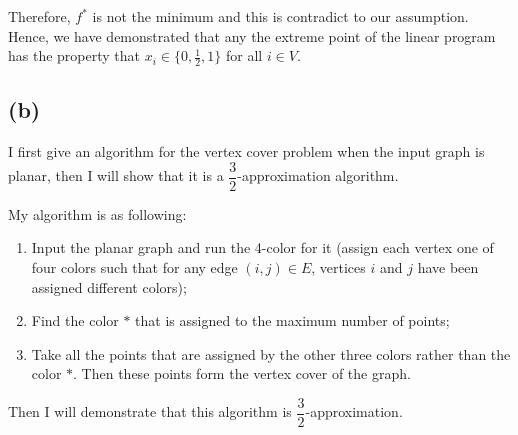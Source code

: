 \documentclass[a4paper,12pt]{article}
\begin{document}
Therefore, $f^*$ is not the minimum and this is contradict to our assumption. Hence, we have demonstrated that any the extreme point of the linear program has the property that  $ x_i \in \{0, \frac{1}{2}, 1\}$ for all $i \in V$. 

\subsection*{(b)}
I first give an algorithm for the vertex cover problem when the input graph is planar, then I will show that it is a $\dfrac{3}{2}$-approximation algorithm.

My algorithm is as following:
\begin{enumerate}
\item Input the planar graph and run the 4-color for it (assign each vertex one of four colors such that for any edge $(i,j) \in E$, vertices $i$ and $j$ have been assigned different colors);
\item Find the color $*$ that is assigned to the maximum number of points;
\item Take all the points that are assigned by the other three colors rather than the color $*$. Then these points form the vertex cover of the graph.
\end{enumerate}

Then I will demonstrate that this algorithm is $\dfrac{3}{2}$-approximation.
\end{document}
